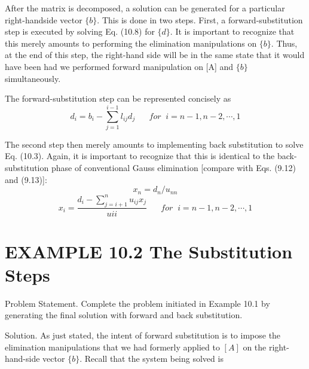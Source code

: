 \documentclass[../main.tex]{subfiles}
\begin{document}
After the matrix is decomposed, a solution can be generated for a particular right-handside vector $\{b\}$. This is done in two steps. First, a forward-substitution step is executed by solving Eq. (10.8) for $\{d\}$. It is important to recognize that this merely amounts to performing the elimination manipulations on $\{b\}$. Thus, at the end of this step, the right-hand side
will be in the same state that it would have been had we performed forward manipulation on [A] and $\{b\}$ simultaneously.

The forward-substitution step can be represented concisely as
\begin{equation}
d_{i}=b_{i}-\sum^{i-1}_{j=1}l_{ij}d_{j}
\; \; \; \; \; \;
for\; \; i=n-1,n-2,\cdots,1
\end{equation}

The second step then merely amounts to implementing back substitution to solve
Eq. (10.3). Again, it is important to recognize that this is identical to the back-substitution phase of conventional Gauss elimination [compare with Eqs. (9.12) and (9.13)]:
\begin{equation}
x_{n}=d_{n}/u_{nn}
\end{equation}
\begin{equation}
x_{i}=\frac{d_{i}-\sum^{n}_{j=i+1}u_{ij}x_{j}}{u{ii}}
\; \; \; \; \; \;
for\; \; i=n-1,n-2,\cdots,1
\end{equation}

\section*{EXAMPLE 10.2 The Substitution Steps}

Problem Statement. Complete the problem initiated in Example 10.1 by generating the
final solution with forward and back substitution.

Solution. As just stated, the intent of forward substitution is to impose the elimination
manipulations that we had formerly applied to $[A]$ on the right-hand-side vector $\{b\}$. Recall that the system being solved is
\end{document}
